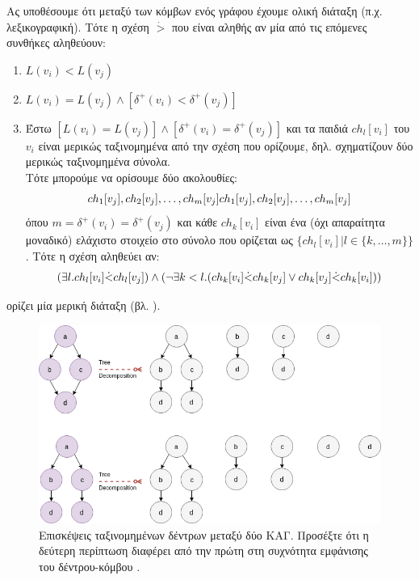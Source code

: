 \begin{definition}
Ας υποθέσουμε ότι μεταξύ των κόμβων ενός γράφου έχουμε ολική διάταξη (π.χ. λεξικογραφική).
Τότε η σχέση $\dot{>}$ που είναι αληθής αν μία από τις επόμενες συνθήκες αληθεύουν:
\begin{enumerate}
\item $L(v_{i}) < L(v_{j})$
\item $L(v_{i}) = L(v_{j}) \wedge [\delta^{+}(v_{i}) < \delta^{+}(v_{j})]$
\item Έστω $[L(v_{i}) = L(v_{j})] \wedge [\delta^{+}(v_{i}) = \delta^{+}(v_{j})]$ και τα παιδιά $ch_{l}[v_{i}]$ του $v_{i}$ είναι μερικώς ταξινομημένα από την σχέση που ορίζουμε, δηλ. σχηματίζουν δύο μερικώς ταξινομημένα σύνολα.\\
Τότε μπορούμε να ορίσουμε δύο ακολουθίες:
$$
ch_{1}[v_{j}], ch_{2}[v_{j}], \dots, ch_{m}[v_{j}]\\
ch_{1}[v_{j}], ch_{2}[v_{j}], \dots, ch_{m}[v_{j}]
$$
όπου $m = \delta^{+}(v_{i}) = \delta^{+}(v_{j})$ και κάθε $ch_{k}[v_{i}]$ είναι ένα (όχι απαραίτητα μοναδικό) ελάχιστο στοιχείο στο σύνολο που ορίζεται ως $\{ch_{l}[v_{i}]|l\in \{k, \dots, m\}\}$.
Τότε η σχέση αληθεύει αν:
$$
(\exists l.ch_{l}[v_{i}]\dot{<}ch_{l}[v_{j}]) \wedge \\
(\neg \exists k < l.(ch_{k}[v_{i}]\dot{<}ch_{k}[v_{j}] \vee ch_{k}[v_{j}]\dot{<}ch_{k}[v_{i}]))
$$
\end{enumerate}
ορίζει μία μερική διάταξη (βλ. \cite[]{Martino2012ATK}).
\end{definition}

\begin{figure}[]
\centering
\includegraphics[width=\textwidth]{figures/odd_sth_2}
\caption[Επισκέψεις ταξινομημένων δέντρων μεταξύ δύο ΚΑΓ.]{Επισκέψεις ταξινομημένων δέντρων μεταξύ δύο ΚΑΓ. Προσέξτε ότι η δεύτερη περίπτωση διαφέρει από την πρώτη στη συχνότητα εμφάνισης του δέντρου-κόμβου .}
\label{fig:odd_sth_2}
\end{figure}

